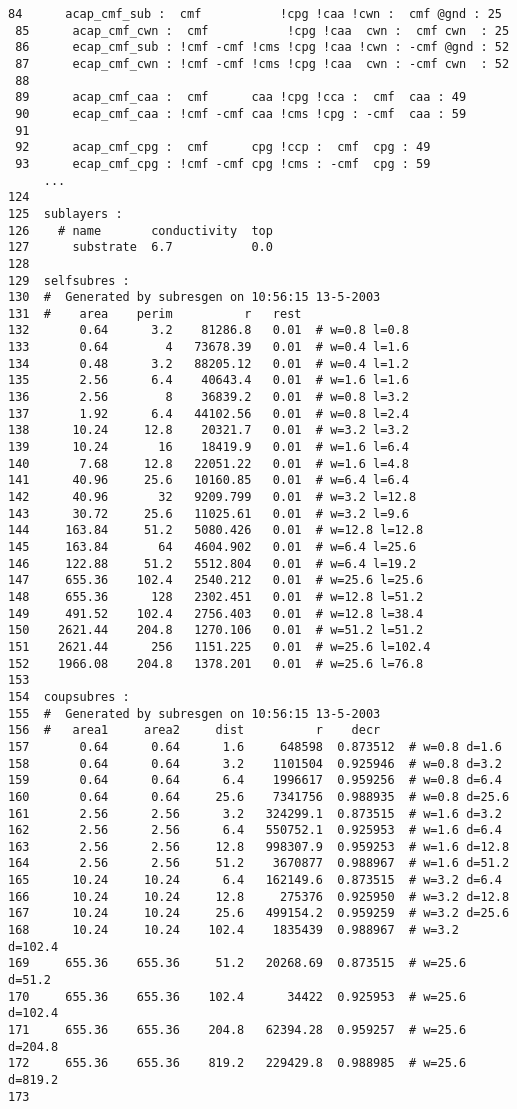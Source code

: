 \begin{Verbatim}[frame=single]
 84      acap_cmf_sub :  cmf           !cpg !caa !cwn :  cmf @gnd : 25
 85      acap_cmf_cwn :  cmf           !cpg !caa  cwn :  cmf cwn  : 25
 86      ecap_cmf_sub : !cmf -cmf !cms !cpg !caa !cwn : -cmf @gnd : 52
 87      ecap_cmf_cwn : !cmf -cmf !cms !cpg !caa  cwn : -cmf cwn  : 52
 88
 89      acap_cmf_caa :  cmf      caa !cpg !cca :  cmf  caa : 49
 90      ecap_cmf_caa : !cmf -cmf caa !cms !cpg : -cmf  caa : 59
 91
 92      acap_cmf_cpg :  cmf      cpg !ccp :  cmf  cpg : 49
 93      ecap_cmf_cpg : !cmf -cmf cpg !cms : -cmf  cpg : 59
     ...
124
125  sublayers :
126    # name       conductivity  top
127      substrate  6.7           0.0
128
129  selfsubres :
130  #  Generated by subresgen on 10:56:15 13-5-2003
131  #    area    perim          r   rest
132       0.64      3.2    81286.8   0.01  # w=0.8 l=0.8
133       0.64        4   73678.39   0.01  # w=0.4 l=1.6
134       0.48      3.2   88205.12   0.01  # w=0.4 l=1.2
135       2.56      6.4    40643.4   0.01  # w=1.6 l=1.6
136       2.56        8    36839.2   0.01  # w=0.8 l=3.2
137       1.92      6.4   44102.56   0.01  # w=0.8 l=2.4
138      10.24     12.8    20321.7   0.01  # w=3.2 l=3.2
139      10.24       16    18419.9   0.01  # w=1.6 l=6.4
140       7.68     12.8   22051.22   0.01  # w=1.6 l=4.8
141      40.96     25.6   10160.85   0.01  # w=6.4 l=6.4
142      40.96       32   9209.799   0.01  # w=3.2 l=12.8
143      30.72     25.6   11025.61   0.01  # w=3.2 l=9.6
144     163.84     51.2   5080.426   0.01  # w=12.8 l=12.8
145     163.84       64   4604.902   0.01  # w=6.4 l=25.6
146     122.88     51.2   5512.804   0.01  # w=6.4 l=19.2
147     655.36    102.4   2540.212   0.01  # w=25.6 l=25.6
148     655.36      128   2302.451   0.01  # w=12.8 l=51.2
149     491.52    102.4   2756.403   0.01  # w=12.8 l=38.4
150    2621.44    204.8   1270.106   0.01  # w=51.2 l=51.2
151    2621.44      256   1151.225   0.01  # w=25.6 l=102.4
152    1966.08    204.8   1378.201   0.01  # w=25.6 l=76.8
153
154  coupsubres :
155  #  Generated by subresgen on 10:56:15 13-5-2003
156  #   area1     area2     dist          r    decr
157       0.64      0.64      1.6     648598  0.873512  # w=0.8 d=1.6
158       0.64      0.64      3.2    1101504  0.925946  # w=0.8 d=3.2
159       0.64      0.64      6.4    1996617  0.959256  # w=0.8 d=6.4
160       0.64      0.64     25.6    7341756  0.988935  # w=0.8 d=25.6
161       2.56      2.56      3.2   324299.1  0.873515  # w=1.6 d=3.2
162       2.56      2.56      6.4   550752.1  0.925953  # w=1.6 d=6.4
163       2.56      2.56     12.8   998307.9  0.959253  # w=1.6 d=12.8
164       2.56      2.56     51.2    3670877  0.988967  # w=1.6 d=51.2
165      10.24     10.24      6.4   162149.6  0.873515  # w=3.2 d=6.4
166      10.24     10.24     12.8     275376  0.925950  # w=3.2 d=12.8
167      10.24     10.24     25.6   499154.2  0.959259  # w=3.2 d=25.6
168      10.24     10.24    102.4    1835439  0.988967  # w=3.2 d=102.4
169     655.36    655.36     51.2   20268.69  0.873515  # w=25.6 d=51.2
170     655.36    655.36    102.4      34422  0.925953  # w=25.6 d=102.4
171     655.36    655.36    204.8   62394.28  0.959257  # w=25.6 d=204.8
172     655.36    655.36    819.2   229429.8  0.988985  # w=25.6 d=819.2
173
\end{Verbatim}
